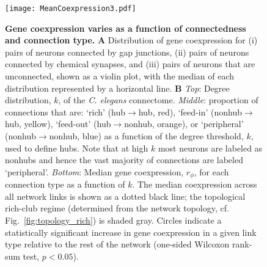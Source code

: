 \documentclass[10pt,letterpaper]{article}
\begin{document}
 \begin{figure}[h]
 \centering
    \texttt{[image: MeanCoexpression3.pdf]}
\caption{{\bf Gene coexpression varies as a function of connectedness and connection type.}
\textbf{A} Distribution of gene coexpression for (i) pairs of neurons connected by gap junctions, (ii) pairs of neurons connected by chemical synapses, and (iii) pairs of neurons that are unconnected, shown as a violin plot, with the median of each distribution represented by a horizontal line.
\textbf{B}
\emph{Top}: Degree distribution, $k$, of the \emph{C. elegans} connectome.
\emph{Middle}: proportion of connections that are:
`rich' (hub$\rightarrow$hub, red),
`feed-in' (nonhub$\rightarrow$hub, yellow),
`feed-out' (hub$\rightarrow$nonhub, orange), or
`peripheral' (nonhub$\rightarrow$nonhub, blue) as a function of the degree threshold, $k$, used to define hubs.
Note that at high $k$ most neurons are labeled as nonhubs and hence the vast majority of connections are labeled `peripheral'.
 \emph{Bottom}: Median gene coexpression, $r_\phi$, for each connection type as a function of $k$.
 The median coexpression across all network links is shown as a dotted black line; the topological rich-club regime (determined from the network topology, cf. Fig.~\ref{fig:topology_rich}) is shaded gray.
Circles indicate a statistically significant increase in gene coexpression in a given link type relative to the rest of the network (one-sided Wilcoxon rank-sum test, $p < 0.05$).
}
 \label{fig:coExp}
\end{figure}
\end{document}
